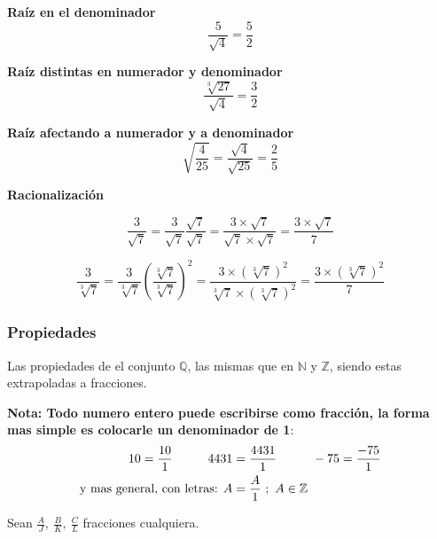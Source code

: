     \textbf{Raíz en el denominador}
    $$\frac{5}{\sqrt{4}} = \frac{5}{2} $$

    \textbf{Raíz distintas en numerador y denominador}
    $$\frac{\sqrt[3]{27}}{\sqrt{4}}  = \frac{3}{2} $$

    \textbf{Raíz afectando a numerador y a denominador}
    $$ \sqrt{\frac{4}{25}} =  \frac{\sqrt{4}}{\sqrt{25}} = \frac{2}{5} $$

    \textbf{Racionalización}

    $$\frac{3}{\sqrt{7}} =\frac{3}{\sqrt{7}} \frac{\sqrt{7}}{\sqrt{7}}
    = \frac{3\times \sqrt{7}}{\sqrt{7}\times\sqrt{7}} = \frac{3\times \sqrt{7}}{7}   $$


    $$\frac{3}{\sqrt[3]{7}} =\frac{3}{\sqrt[3]{7}} \left(\frac{\sqrt[3]{7}}{\sqrt[3]{7}}\right)^2
    = \frac{3\times (\sqrt[3]{7})^2 }{\sqrt[3]{7}\times(\sqrt[3]{7})^2} = \frac{3\times (\sqrt[3]{7})^2}{7}   $$


\subsubsection*{Propiedades}
    Las propiedades de el conjunto $\mathbb{Q}$, las mismas que en $\mathbb{N}$
    y $\mathbb{Z}$, siendo estas extrapoladas a fracciones.

    \textbf{Nota: Todo numero entero puede escribirse como fracción, la forma mas
    simple es colocarle un denominador de 1}:
    \begin{align*}
        10=\frac{10}{1} \hspace*{1cm}	4431 &= \frac{4431}{1}\hspace*{1cm}	-75=\frac{-75}{1} \\
        \text{y mas general, con letras:  } A &= \frac{A}{1}\ ;\ A\in \mathbb{Z}
    \end{align*}


    Sean $\displaystyle \frac{A}{J},\ \frac{B}{K},\ \frac{C}{L}$ fracciones cualquiera.

